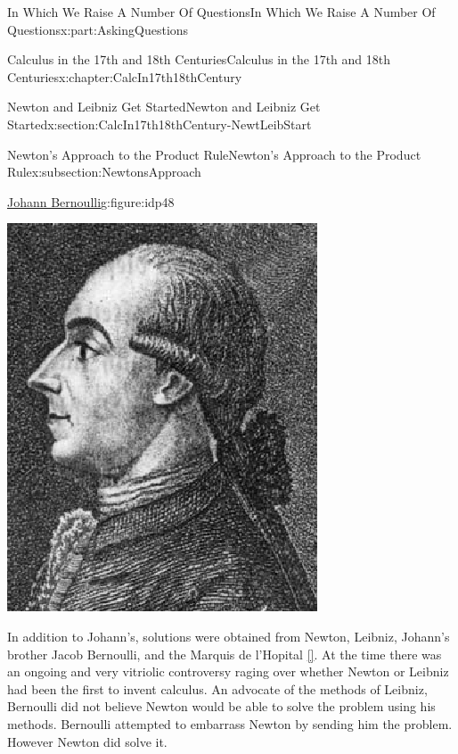 \documentclass[oneside,10pt,]{book}
\newcommand{\xreffont}{\relax}
\numberwithin{equation}{section}
\begin{document}
\begin{partptx}{In Which We Raise A Number Of Questions}{}{In Which We Raise A Number Of Questions}{}{}{x:part:AskingQuestions}
\begin{chapterptx}{Calculus in the 17th and 18th Centuries}{}{Calculus in the 17th and 18th Centuries}{}{}{x:chapter:CalcIn17th18thCentury}
\begin{sectionptx}{Newton and Leibniz Get Started}{}{Newton and Leibniz Get Started}{}{}{x:section:CalcIn17th18thCentury-NewtLeibStart}
\begin{subsectionptx}{Newton's Approach to the Product Rule}{}{Newton's Approach to the Product Rule}{}{}{x:subsection:NewtonsApproach}
\begin{figureptx}{\href{https://mathshistory.st-andrews.ac.uk/Biographies/Bernoulli_Johann/}{Johann Bernoulli}\protect\footnotemark{}}{g:figure:idp48}{}
\begin{image}{0.325}{0.35}{0.325}
\includegraphics[width=\linewidth]{images/BernoulliJohann.png}
\end{image}%
\tcblower
\end{figureptx}%
%
In addition to Johann's, solutions were obtained from Newton,  Leibniz, Johann's brother Jacob Bernoulli,  and the Marquis de l'Hopital \hyperlink{x:biblio:struik69__sourc_book_mathem}{[{\xreffont 15}]}.  At the time there was an ongoing and very vitriolic controversy raging over whether Newton or Leibniz had been the first to invent calculus.  An advocate of the methods of Leibniz, Bernoulli did not believe Newton would be able to solve the problem using his methods. Bernoulli attempted to embarrass Newton by sending him the problem.  However Newton did solve it.%
\par

\end{subsectionptx}
\end{sectionptx}
\end{chapterptx}
\end{partptx}
\end{document}
